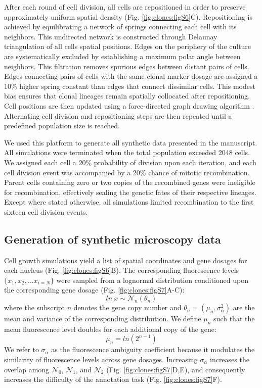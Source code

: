 After each round of cell division, all cells are repositioned in order to preserve approximately uniform spatial density (Fig. \ref{fig:clones:figS6}C). Repositioning is achieved by equilibrating a network of springs connecting each cell with its neighbors. This undirected network is constructed through Delaunay triangulation of all cells spatial positions. Edges on the periphery of the culture are systematically excluded by establishing a maximum polar angle between neighbors. This filtration removes spurious edges between distant pairs of cells. Edges connecting pairs of cells with the same clonal marker dosage are assigned a 10\% higher spring constant than edges that connect dissimilar cells. This modest bias ensures that clonal lineages remain spatially collocated after repositioning. Cell positions are then updated using a force-directed graph drawing algorithm \cite{Kamada1989}. Alternating cell division and repositioning steps are then repeated until a predefined population size is reached.

We used this platform to generate all synthetic data presented in the manuscript. All simulations were terminated when the total population exceeded 2048 cells. We assigned each cell a 20\% probability of division upon each iteration, and each cell division event was accompanied by a 20\% chance of mitotic recombination. Parent cells containing zero or two copies of the recombined genes were ineligible for recombination, effectively sealing the genetic fates of their respective lineages. Except where stated otherwise, all simulations limited recombination to the first sixteen cell division events.

\subsection{Generation of synthetic microscopy data}
\label{appendix:methods:clones:fluorescence_simulation}

Cell growth simulations yield a list of spatial coordinates and gene dosages for each nucleus (Fig. \ref{fig:clones:figS6}B). The corresponding fluorescence levels $\{x_1, x_2, \ldots x_{i=N} \}$ were sampled from a lognormal distribution conditioned upon the corresponding gene dosage (Fig. \ref{fig:clones:figS7}A-C):
\begin{equation}
ln\ x \sim \mathcal{N}_n(\theta _n)
\end{equation}
where the subscript $n$ denotes the gene copy number and $\theta_n = (\mu_n,\sigma_{\alpha}^2)$ are the mean and variance of the corresponding distribution. We define $\mu_n$ such that the mean fluorescence level doubles for each additional copy of the gene:
\begin{equation}
\mu_{n } = ln(2^{n-1})
\end{equation}
We refer to $\sigma_{\alpha}$ as the fluorescence ambiguity coefficient because it modulates the similarity of fluorescence levels across gene dosages. Increasing $\sigma_{\alpha}$ increases the overlap among $\mathcal{N}_0$, $\mathcal{N}_1$, and $\mathcal{N}_2$ (Fig. \ref{fig:clones:figS7}D,E), and consequently increases the difficulty of the annotation task (Fig. \ref{fig:clones:figS7}F).

